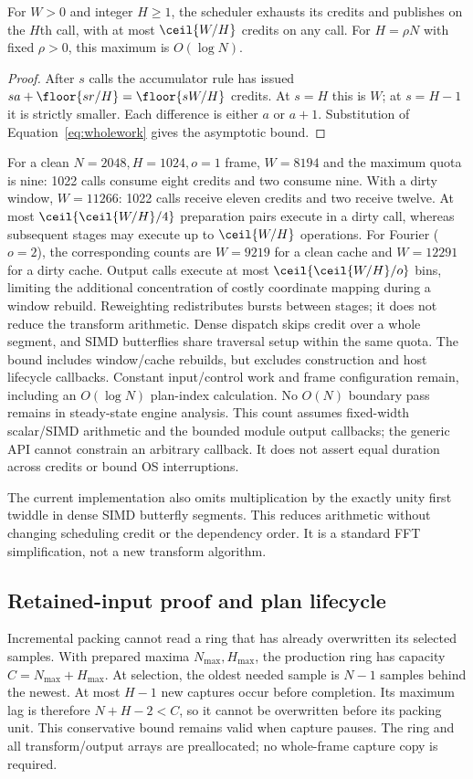 \begin{proposition}
For $W>0$ and integer $H\ge1$, the scheduler exhausts its credits and
publishes on the $H$th call, with at most $\ceil{W/H}$ credits on any call.
For $H=\rho N$ with fixed $\rho>0$, this maximum is $O(\log N)$.
\end{proposition}
\begin{proof}
After $s$ calls the accumulator rule has issued
$sa+\floor{sr/H}=\floor{sW/H}$ credits. At $s=H$ this is $W$;
at $s=H-1$ it is strictly smaller. Each difference is either $a$ or $a+1$.
Substitution of Equation~\eqref{eq:wholework} gives the asymptotic bound.
\end{proof}
For a clean $N=2048,H=1024,o=1$ frame, $W=8194$ and the maximum quota is nine:
1022 calls consume eight credits and two consume nine. With a dirty window,
$W=11266$: 1022 calls receive eleven credits and two receive twelve.
At most $\ceil{\ceil{W/H}/4}$ preparation pairs execute in a dirty call,
whereas subsequent stages may execute up to $\ceil{W/H}$ operations.
For Fourier ($o=2$), the corresponding counts are $W=9219$ for a clean cache
and $W=12291$ for a dirty cache. Output calls execute at most
$\ceil{\ceil{W/H}/o}$ bins, limiting the additional concentration of costly
coordinate mapping during a window rebuild. Reweighting redistributes bursts
between stages; it does not reduce the transform arithmetic. Dense dispatch skips
credit over a whole segment, and SIMD butterflies share traversal setup
within the same quota. The bound includes window/cache
rebuilds, but excludes construction and host lifecycle callbacks. Constant
input/control work and frame configuration remain, including an $O(\log N)$
plan-index calculation. No $O(N)$ boundary pass remains in steady-state engine
analysis. This count assumes fixed-width scalar/SIMD arithmetic and the bounded
module output callbacks; the generic API cannot constrain an arbitrary callback.
It does not assert equal duration across credits or bound OS interruptions.

The current implementation also omits multiplication by the exactly unity
first twiddle in dense SIMD butterfly segments. This reduces arithmetic
without changing scheduling credit or the dependency order. It is a standard
FFT simplification, not a new transform algorithm.

\subsection{Retained-input proof and plan lifecycle}
Incremental packing cannot read a ring that has already overwritten its
selected samples. With prepared maxima $N_{\max},H_{\max}$, the production
ring has capacity $C=N_{\max}+H_{\max}$. At selection, the oldest needed sample
is $N-1$ samples behind the newest. At most $H-1$ new captures occur before
completion. Its maximum lag is therefore $N+H-2<C$, so it cannot be
overwritten before its packing unit. This conservative bound remains valid
when capture pauses. The ring and all transform/output arrays are preallocated;
no whole-frame capture copy is required.

